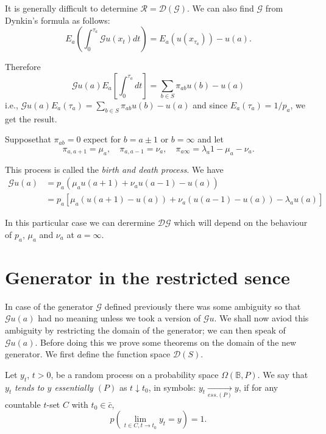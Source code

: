 \begin{remark*}
It is generally difficult to determine $\mathscr{R} = \mathscr{D}
  (\mathscr{G})$. We can also find $\mathscr{G}$ from Dynkin's formula
  as follows: 
  $$
  E_a \left(\int^{\tau_a}_0 \mathscr{G} u (x_t) dt\right) = E_a
  (u(x_{\tau_a})) - u(a). 
  $$
\end{remark*}

Therefore
$$
\mathscr{G} u (a)E_a \left[\int^{\tau_a}_0  dt\right]= \sum_{b \in S}
\pi_{ab} u (b) - u (a)  
$$
i.e., $\mathscr{G} u (a) E_a (\tau_a) = \sum\limits_{b \in S}
\pi _{ab} u (b) - u (a)$  
and since $E_a (\tau_a) = 1/p_a$, we get the result.

\begin{example*}
Suppose\pageoriginale that $\pi_{ab} = 0$ expect for $b = a \pm 1$ or $b = \infty$ and let
$$
\pi_{a,a+1} = \mu_a,\quad \pi_{a,a-1} = \nu_a,\quad \pi_{a \infty} = \lambda_a
  1-\mu_a - \nu_a. 
$$
\end{example*}

This process is called the \textit{birth and death process}. We have
\begin{align*}
\mathscr{G} u (a) & = p_a (\mu_a u (a+1) + \nu_a u (a-1) - u (a))\\
  & = p_a \left[ \mu_a (u (a+1) -u (a)) + \nu_a (u(a-1) -u(a)) -
    \lambda_a u(a)\right] 
\end{align*}

In this particular case we can derermine $\mathscr{D} \mathscr{G}$
which will depend on the behaviour of $p_a$, $\mu_a$ and $\nu_a$ at $a =
\infty$. 

\section{Generator in the restricted sence}\label{chap2-sec9}%

In case of the generator $\mathscr{G}$ defined previously there was
some ambiguity so that $\mathscr{G} u (a)$ had no meaning unless we
took a version of $\mathscr{G} u$. We shall now aviod this ambiguity
by restricting the domain of the generator; we can then speak of
$\mathscr{G} u (a)$. Before doing this we prove some theorems on the
domain of the new generator. We first define the function space
$\mathscr{D}(S)$.   

\begin{defi*}
Let $y_t$, $t > 0$, be a random process on a probability space $\Omega
  (\mathbb{B}, P)$. We say that $y_t$ \textit{tends to $y$ essentially
    $(P)$} as $t \downarrow t_0$, in symbols: $y_t
  \xrightarrow[ess.(P)]{} y$, if for any countable $t$-set $C$ with
  $t_0 \in \bar{c}$, 
  $$
  p\left(\lim_{t \in C, t \to t_0} y_t = y\right) =1.
  $$
\end{defi*} 

